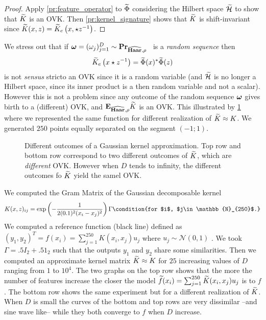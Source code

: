 \begin{proof} Apply \cref{pr:feature_operator} to $\widetilde{\Phi}$ considering the Hilbert space $\widetilde{\mathcal{H}}$ to show that $\widetilde{K}$ is an \acs{OVK}. Then \cref{pr:kernel_signature} shows that $\widetilde{K}$ is shift-invariant since $\widetilde{K}(x,z)=\widetilde{K}_e\left(x,\star z^{-1}\right)$.
\end{proof}
We stress out that if $\boldsymbol{\mathbf{\omega}}=(\omega_j)_{j=1}^D\sim {\mathbf{{Pr}}}_{\widehat{\mathbf{Haar}},\rho}$ \iid~is a \emph{random sequence} then
\begin{dmath*}
\tildeK{\omega}_e\left(x\groupop z^{-1}\right)=\tildePhi{\omega}(x)^{\adjoint}\tildePhi{\omega}(z)
\end{dmath*}
is not \emph{sensus} stricto an \acl{OVK} since it is a random variable (and $\widetilde{\mathcal{H}}$ is no longer a Hilbert space, since its inner product is a then random variable and not a scalar). However this is not a problem since any outcome of the random sequence $\boldsymbol{\mathbf{\omega}}$ gives birth to a (different) \acl{OVK}, and ${\mathbf{{E}}}_{\widehat{\mathbf{Haar}},\rho}\widetilde{K}$ is an \acs{OVK}. This illustrated by \cref{fig:not_Mercer} where we represented the same function for different realization of $\widetilde{K}\approx K$. We generated $250$ points equally separated on the segment $(-1;1)$.
\begin{figure}[htb]
\centering
\resizebox{\textwidth}{!}{%

}
\caption[Different outcomes of a Gaussian kernel approximation]{Different outcomes of a Gaussian kernel approximation. Top row and bottom row correspond to two different outcomes of $\widetilde{K}$, which are \emph{different} \acl{OVK}. However when $D$ tends to infinity, the different outcomes fo $\widetilde{K}$ yield the samel \acs{OVK}.}
\label{fig:not_Mercer}
\end{figure}
We computed the Gram Matrix of the Gaussian decomposable kernel
\begin{dmath*}
K(x,z)_{ij}=\exp\left(-\frac{1}{2(0.1)^2(x_i - x_j)^2}\right)\Gamma \condition{for $i$, $j\in\mathbb{N}_{250}$.}
\end{dmath*}
We computed a reference function (black line) defined as $(y_1, y_2)^T = f(x_i)=\sum_{j=1}^{250}K(x_i,x_j)u_j$ where $u_j\sim\mathcal{N}(0,1)$ \iid. We took $\Gamma=.5 I_2 + .5 1_2$ such that the outputs $y_1$ and $y_2$ share some similarities. Then we computed an approximate kernel matrix $\widetilde{K}\approx K$ for $25$ increasing values of $D$ ranging from $1$ to $10^4$. The two graphs on the top row shows that the more the number of features increase the closer the model $\widetilde{f}(x_i)=\sum_{j=1}^{250}\widetilde{K}(x_i,x_j)u_j$ is to $f$. The bottom row shows the same experiment but for a different realization of $\widetilde{K}$. When $D$ is small the curves of the bottom and top rows are very dissimilar --and sine wave like-- while they both converge to $f$ when $D$ increase.
